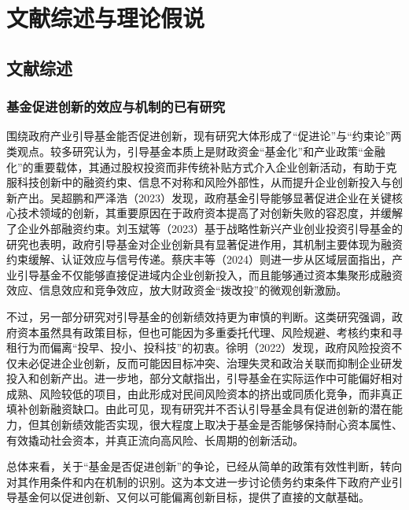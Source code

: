 \documentclass[UTF8,a4paper,zihao=5,fontset=fandol]{ctexart}
\begin{document}

\section{文献综述与理论假说}

\subsection{文献综述}

\subsubsection{基金促进创新的效应与机制的已有研究}

围绕政府产业引导基金能否促进创新，现有研究大体形成了“促进论”与“约束论”两类观点。较多研究认为，引导基金本质上是财政资金“基金化”和产业政策“金融化”的重要载体，其通过股权投资而非传统补贴方式介入企业创新活动，有助于克服科技创新中的融资约束、信息不对称和风险外部性，从而提升企业创新投入与创新产出。吴超鹏和严泽浩（2023）发现，政府基金引导能够显著促进企业在关键核心技术领域的创新，其重要原因在于政府资本提高了对创新失败的容忍度，并缓解了企业外部融资约束。刘玉斌等（2023）基于战略性新兴产业创业投资引导基金的研究也表明，政府引导基金对企业创新具有显著促进作用，其机制主要体现为融资约束缓解、认证效应与信号传递。蔡庆丰等（2024）则进一步从区域层面指出，产业引导基金不仅能够直接促进域内企业创新投入，而且能够通过资本集聚形成融资效应、信息效应和竞争效应，放大财政资金“拨改投”的微观创新激励。

不过，另一部分研究对引导基金的创新绩效持更为审慎的判断。这类研究强调，政府资本虽然具有政策目标，但也可能因为多重委托代理、风险规避、考核约束和寻租行为而偏离“投早、投小、投科技”的初衷。徐明（2022）发现，政府风险投资不仅未必促进企业创新，反而可能因目标冲突、治理失灵和政治关联而抑制企业研发投入和创新产出。进一步地，部分文献指出，引导基金在实际运作中可能偏好相对成熟、风险较低的项目，由此形成对民间风险资本的挤出或同质化竞争，而非真正填补创新融资缺口。由此可见，现有研究并不否认引导基金具有促进创新的潜在能力，但其创新绩效能否实现，很大程度上取决于基金是否能够保持耐心资本属性、有效撬动社会资本，并真正流向高风险、长周期的创新活动。

总体来看，关于“基金是否促进创新”的争论，已经从简单的政策有效性判断，转向对其作用条件和内在机制的识别。这为本文进一步讨论债务约束条件下政府产业引导基金何以促进创新、又何以可能偏离创新目标，提供了直接的文献基础。
\end{document}
